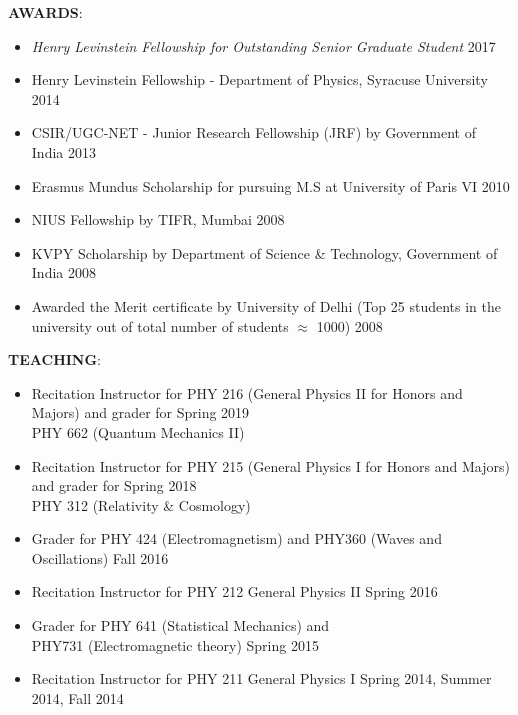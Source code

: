 {\bf AWARDS}:
 \begin{itemize}
 \item \emph{Henry Levinstein Fellowship for Outstanding Senior Graduate Student} \hfill 2017 
\item Henry Levinstein Fellowship - Department of Physics, Syracuse University \hfill 2014
 \item CSIR/UGC-NET - Junior Research Fellowship (JRF) by Government of India \hfill 2013
 \item Erasmus Mundus Scholarship for pursuing M.S at University of Paris VI \hfill 2010
 \item NIUS Fellowship by TIFR, Mumbai \hfill 2008
 \item KVPY Scholarship by Department of Science \& Technology, Government of India \hfill 2008
 \item Awarded the Merit certificate by University of Delhi (Top 25 students in the university out of total number of students $\approx$ 1000) \hfill 2008

 \end{itemize}




{\bf TEACHING}:
 \begin{itemize}
  \item Recitation Instructor for PHY 216 (General Physics II for Honors and Majors) and grader for  \hfill Spring 2019 \\ PHY 662 (Quantum Mechanics II)  \hfill 
  \item Recitation Instructor for PHY 215 (General Physics I for Honors and Majors) and grader for  \hfill Spring 2018 \\ PHY 312 (Relativity \& Cosmology)  \hfill 
 \item Grader for PHY 424 (Electromagnetism) and PHY360 (Waves and Oscillations)  \hfill Fall 2016
 \item Recitation Instructor for PHY 212 General Physics II \hfill Spring 2016
 \item Grader for PHY 641 (Statistical Mechanics) and \\ PHY731 (Electromagnetic theory)  \hfill Spring 2015
 \item Recitation Instructor for PHY 211 General Physics I \hfill Spring 2014, Summer 2014, Fall 2014
 \end{itemize}



